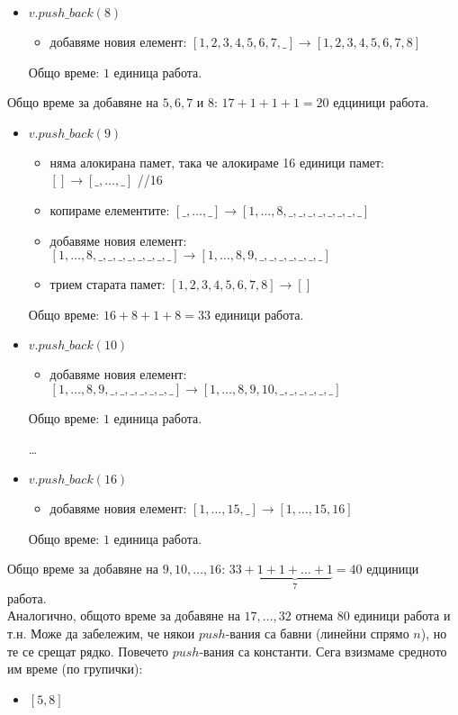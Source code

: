 \begin{examplecp}
\begin{itemize}
		\item $v.push\_back(8)$
		\begin{itemize}
			\item добавяме новия елемент: $[1,2,3,4,5,6,7,\_]\to[1,2,3,4,5,6,7,8]$
		\end{itemize}
		Общо време: $1$ единица работа.
	\end{itemize}
	Общо време за добавяне на $5,6,7$ и $8$: $17+1+1+1=20$ едциници работа.
	
	
	\begin{itemize}
		\item $v.push\_back(9)$
		\begin{itemize}
			\item няма алокирана памет, така че алокираме 16 единици памет: $[]\to[\_,\dots,\_]$ //16
			\item копираме елементите: $[\_,\dots,\_]\to[1,\dots,8,\_,\_,\_,\_,\_,\_,\_,\_]$
			\item добавяме новия елемент: $[1,\dots,8,\_,\_,\_,\_,\_,\_,\_,\_]\to[1,\dots,8,9,\_,\_,\_,\_,\_,\_,\_]$
			\item трием старата памет: $[1,2,3,4,5,6,7,8]\to[]$
		\end{itemize}
		Общо време: $16+8+1+8=33$ единици работа.
		
		\item $v.push\_back(10)$
		\begin{itemize}
			\item добавяме новия елемент: $[1,\dots,8,9,\_,\_,\_,\_,\_,\_,\_]\to[1,\dots,8,9,10,\_,\_,\_,\_,\_,\_]$
		\end{itemize}
		Общо време: $1$ единица работа.
		\begin{center}
			\dots
		\end{center}
		\item $v.push\_back(16)$
		\begin{itemize}
			\item добавяме новия елемент: $[1,\dots,15,\_]\to[1,\dots,15,16]$
		\end{itemize}
		Общо време: $1$ единица работа.
	\end{itemize}
	Общо време за добавяне на $9,10,\dots,16$: $33+\underbrace{1+1+\dots+1}_7=40$ едциници работа.\\
	Аналогично, общото време за добавяне на $17,\dots,32$ отнема $80$ единици работа и т.н. Може да забележим, че някои $push$-вания са бавни (линейни спрямо $n$), но те се срещат рядко. Повечето $push$-вания са константи. Сега взизмаме средното им време (по групички):
	\begin{itemize}
		\item $[5,8]$
		

\end{itemize}
\end{examplecp}
